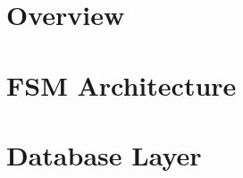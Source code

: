 
\newcommand*{\archi}{chapters/architecture/}

\section{Overview}
	
\section{FSM Architecture}
	
	
\section{Database Layer}
	